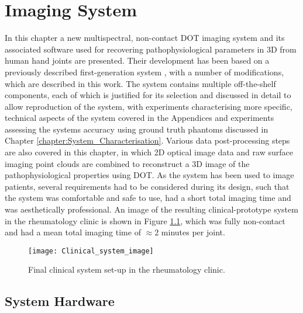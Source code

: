\documentclass[twoside]{bhamthesis}
\theoremstyle{definition}
\begin{document}
\chapter{Imaging System}

\label{Imaging System}

In this chapter a new multispectral, non-contact DOT imaging system and its associated software used for recovering pathophysiological parameters in 3D from human hand joints are presented. Their development has been based on a previously described first-generation system \cite{wu2016development}, with a number of modifications, which are described in this work. The system contains multiple off-the-shelf components, each of which is justified for its selection and discussed in detail to allow reproduction of the system, with experiments characterising more specific, technical aspects of the system covered in the Appendices and experiments assessing the systems accuracy using ground truth phantoms discussed in Chapter \ref{chapter:System_Characterisation}. Various data post-processing steps are also covered in this chapter, in which 2D optical image data and raw surface imaging point clouds are combined to reconstruct a 3D image of the pathophysiological properties using DOT. As the system has been used to image patients, several requirements had to be considered during its design, such that the system was comfortable and safe to use, had a short total imaging time and was aesthetically professional. An image of the resulting clinical-prototype system in the rheumatology clinic is shown in Figure \ref{fig:Clinical_system_image}, which was fully non-contact and had a mean total imaging time of $\approx$2 minutes per joint. 

\begin{figure}[!ht]
\centering
  \texttt{[image: Clinical\_system\_image]}
\caption{Final clinical system set-up in the rheumatology clinic.}
  \label{fig:Clinical_system_image}
\end{figure}

\section{System Hardware}
\end{document}
